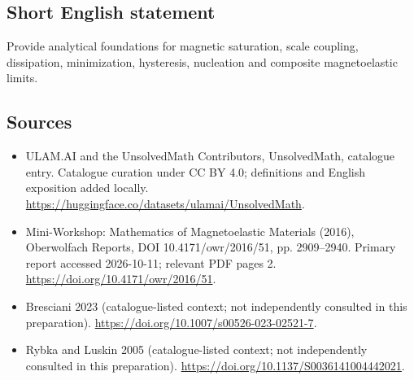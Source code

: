 \documentclass[11pt]{article}
\begin{document}
\subsection{Short English statement}
Provide analytical foundations for magnetic saturation, scale coupling, dissipation, minimization, hysteresis, nucleation and composite magnetoelastic limits.
\subsection{Sources}
\begin{itemize}
\item[\hypertarget{source:statement:1}{S1}] ULAM.AI and the UnsolvedMath Contributors, UnsolvedMath, catalogue entry. Catalogue curation under CC BY 4.0; definitions and English exposition added locally.
\url{https://huggingface.co/datasets/ulamai/UnsolvedMath}.
\item[\hypertarget{source:statement:2}{S2}] Mini-Workshop: Mathematics of Magnetoelastic Materials (2016), Oberwolfach Reports, DOI 10.4171/owr/2016/51, pp. 2909--2940. Primary report accessed 2026-10-11; relevant PDF pages 2.
\url{https://doi.org/10.4171/owr/2016/51}.
\item[\hypertarget{source:statement:3}{S3}] Bresciani 2023 (catalogue-listed context; not independently consulted in this preparation).
\url{https://doi.org/10.1007/s00526-023-02521-7}.
\item[\hypertarget{source:statement:4}{S4}] Rybka and Luskin 2005 (catalogue-listed context; not independently consulted in this preparation).
\url{https://doi.org/10.1137/S0036141004442021}.
\end{itemize}
\label{end:statement}
\end{document}
